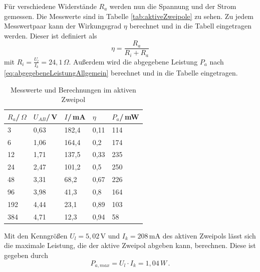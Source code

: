 Für verschiedene Widerstände $R_a$ werden nun die Spannung und der Strom gemessen. Die Messwerte sind in Tabelle \ref{tab:aktiveZweipole} zu sehen. Zu jedem Messwertpaar kann der Wirkungsgrad $\eta$ berechnet und in die Tabell eingetragen werden. Dieser ist definiert als
\begin{equation*}
    \label{eq:wirkungsgrad}
    \eta = \frac{R_a}{R_i+R_a}
\end{equation*} mit $R_i = \frac{U_l}{I_k} = 24,1\,\Omega$. Außerdem wird die abgegebene Leistung $P_a$ nach \eqref{eq:abgegebeneLeistungAllgemein} berechnet und in die Tabelle eingetragen.
\begin{center}
    \begin{table}[ht]
        \begin{tabularx}{\linewidth}{|*{5}{X|}}
            \hline
            $R_a$/\,$\Omega$ & $U_{AB}$/\,V & $I$/\,mA & ${\eta}$ & $P_a$/\,mW \\
            \hline
            3                & 0,63         & 182,4    & 0,11     & 114        \\
            6                & 1,06         & 164,4    & 0,2      & 174        \\
            12               & 1,71         & 137,5    & 0,33     & 235        \\
            24               & 2,47         & 101,2    & 0,5      & 250        \\
            48               & 3,31         & 68,2     & 0,67     & 226        \\
            96               & 3,98         & 41,3     & 0,8      & 164        \\
            192              & 4,44         & 23,1     & 0,89     & 103        \\
            384              & 4,71         & 12,3     & 0,94     & 58         \\
            \hline
        \end{tabularx}
        \caption{Messwerte und Berechnungen im aktiven Zweipol}
        \label{tab:messwerteAktiverZweipol}
    \end{table}
\end{center}

Mit den Kenngrößen $U_l=5,02\,$V und $I_k=208\,$mA des aktiven Zweipols lässt sich die maximale Leistung, die der aktive Zweipol abgeben kann, berechnen. Diese ist gegeben durch
\begin{equation*}
    P_{a,max} = U_l \cdot I_k = 1,04\,W\, .
\end{equation*}

